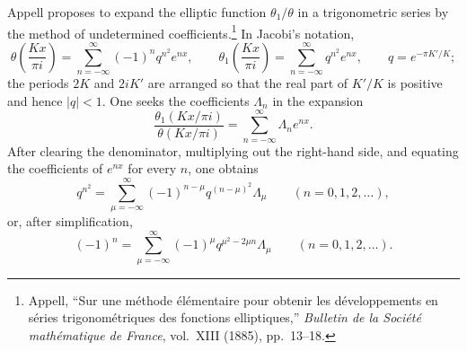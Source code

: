 \documentclass[
  paper=b5,
  fontsize=13pt,
  twoside=true,
  open=any,
  bookmarkpackage=false,
  chapterprefix=true,
  headings=normal
]{scrbook}
\theoremstyle{definition}
\begin{document}
Appell proposes to expand the elliptic function $\theta_1/\theta$ in a trigonometric series by the method of undetermined coefficients.\footnote{Appell, ``Sur une m\'ethode \'el\'ementaire pour obtenir les d\'eveloppements en s\'eries trigonom\'etriques des fonctions elliptiques,'' \emph{Bulletin de la Soci\'et\'e math\'ematique de France}, vol.~XIII (1885), pp.~13--18.} In Jacobi's notation,
\[
 \theta\!\left(\frac{Kx}{\pi i}\right)
   =\sum_{n=-\infty}^{\infty}(-1)^n q^{n^2}e^{nx},\qquad
 \theta_1\!\left(\frac{Kx}{\pi i}\right)
   =\sum_{n=-\infty}^{\infty}q^{n^2}e^{nx},\qquad
 q=e^{-\pi K'/K};
\]
the periods $2K$ and $2iK'$ are arranged so that the real part of $K'/K$ is positive and hence $|q|<1$. One seeks the coefficients $\Lambda_n$ in the expansion
\[
  \frac{\theta_1(Kx/\pi i)}{\theta(Kx/\pi i)}
  =\sum_{n=-\infty}^{\infty}\Lambda_ne^{nx}.
\]
After clearing the denominator, multiplying out the right-hand side, and equating the coefficients of $e^{nx}$ for every $n$, one obtains
\[
 q^{n^2}=\sum_{\mu=-\infty}^{\infty}
 (-1)^{n-\mu}q^{(n-\mu)^2}\Lambda_\mu
 \qquad(n=0,1,2,\ldots),
\]
or, after simplification,
\[
 (-1)^n=\sum_{\mu=-\infty}^{\infty}
 (-1)^\mu q^{\mu^2-2\mu n}\Lambda_\mu
 \qquad(n=0,1,2,\ldots).
\]
\end{document}
